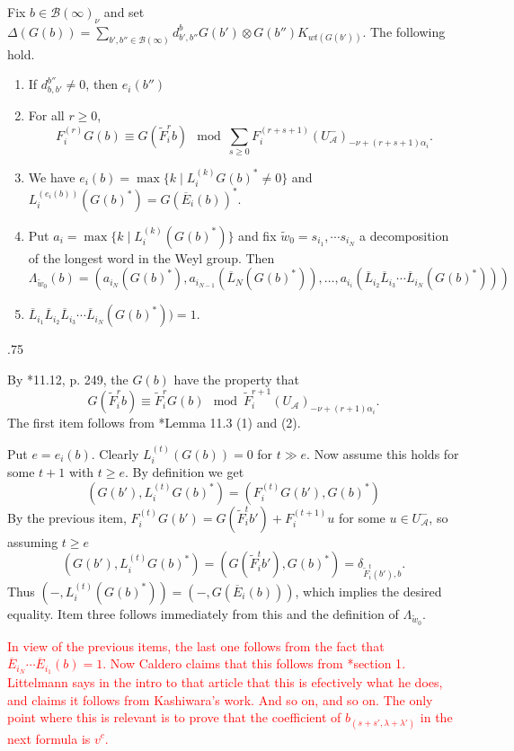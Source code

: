 \documentclass[11pt,fleqn]{article}
\makeatletter
\renewenvironment{proof}[1][\textit{Proof}]{\par
  \pushQED{\qed}%
  \normalfont \topsep.75\paraskip\relax
  \trivlist
  \item[\hskip\labelsep
        \itshape
    #1\@addpunct{.}]\ignorespaces
}{%
  \popQED\endtrivlist\@endpefalse
}
\newcommand\ot{\otimes}
\newcommand\A{\mathcal A}
\newcommand\B{\mathcal B}
\makeatother
\begin{document}
\begin{Lemma*}
Fix $b \in \B(\infty)_{\nu}$ and set $\Delta(G(b)) = 
\sum_{b',b'' \in \B(\infty)} d_{b',b''}^{b} G(b') \ot G(b'')K_{wt(G(b'))}$. 
The following hold.
\begin{enumerate}
\item If $d_{b,b'}^{b''} \neq 0$, then $e_i(b'')$

\item For all $r \geq 0$,
\[
  F_i^{(r)}G(b) 
    \equiv G(\tilde F_i^r b) \mod 
    \sum_{s \geq 0} F_i^{(r+s+1)}(U^-_\A)_{-\nu+(r+s+1)\alpha_i}.
\]

\item We have $e_i(b) = \max \{k \mid L_i^{(k)}G(b)^* \neq 0\}$ and
$L_i^{(e_i(b))}(G(b)^*) = G(\overline E_i(b))^*$.

\item Put $a_i = \max \{k \mid L_i^{(k)}(G(b)^*)\}$ and fix $\tilde w_0
=s_{i_1}, \cdots s_{i_N}$ a decomposition of the longest word in the Weyl 
group. Then
\[
  \Lambda_{\tilde w_0}(b)
    = (a_{i_N}(G(b)^*), a_{i_{N-1}}(\overline L_N(G(b)^*)), \ldots, 
    a_{i_i}(\overline L_{i_2} \overline L_{i_3} \cdots \overline L_{i_N}
    (G(b)^*)))
\]

\item $\overline L_{i_1} \overline L_{i_2} \overline L_{i_3} \cdots \overline 
L_{i_N} (G(b)^*)) = 1$.
\end{enumerate}
\end{Lemma*}
\begin{proof}
By \cite{Jan}*{11.12, p. 249}, the $G(b)$ have the property that
\[
  G(\tilde F_i^r b) \equiv \tilde F_i^r G(b) \mod 
    \tilde F_i^{r+1}(U_\A)_{-\nu + (r+1) \alpha_i}.
\]
The first item follows from \cite{Jan}*{Lemma 11.3 (1) and (2)}.

Put $e = e_i(b)$. Clearly $L_i^{(t)}(G(b)) = 0$ for $t \gg e$. Now assume this 
holds for some $t+1$ with $t \geq e$. By definition we get
\[
  (G(b'), L^{(t)}_i G(b)^*) = (F_i^{(t)}G(b'), G(b)^*)
\]
By the previous item, $F_i^{(t)}G(b') = G(\tilde F_i^t b') + F_i^{(t+1)}u$ 
for some $u \in U^-_\A$, so assuming $t \geq e$
\[
  (G(b'), L^{(t)}_i G(b)^*) = (G(\tilde F_i^t b'), G(b)^*) = 
  \delta_{\tilde F_i^t(b'), b}.
\]
Thus $(-, L_i^{(t)}(G(b)^*)) = (-,G(\overline E_i(b)))$, which implies the 
desired equality. Item three follows immediately from this and the definition
of $\Lambda_{\tilde w_0}$.

\textcolor{red}{
In view of the previous items, the last one follows from the fact that 
$\overline E_{i_N} \cdots \overline E_{i_1} (b) = 1$. Now Caldero claims that 
this follows from \cite{Lit}*{section 1}. Littelmann says in the intro to 
that article that this is efectively what he does, and claims it follows from 
Kashiwara's work. And so on, and so on. The only point where this is relevant
is to prove that the coefficient of $b_{(s+s',\lambda+\lambda')}$ in the next 
formula is $v^c$.
}
\end{proof}
\end{document}

